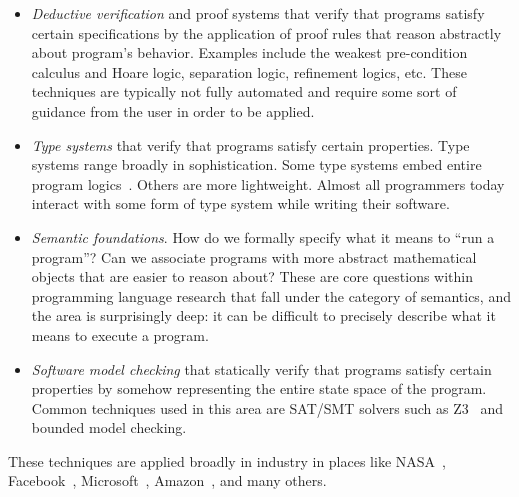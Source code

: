\documentclass{../tufte-handout}
\begin{document}
\begin{itemize}
  \item \emph{Deductive verification} and proof systems that verify that 
  programs satisfy certain specifications by the application of proof 
  rules that reason abstractly about program's behavior. Examples include the weakest
  pre-condition calculus and Hoare logic, separation logic, refinement logics, etc. 
  These techniques are typically not fully automated and require some sort of 
  guidance from the user in order to be applied.
  \item \emph{Type systems} that verify that programs satisfy certain
  properties. Type systems range broadly in sophistication. Some type systems 
  embed entire program logics~\citep{jhala2021refinement}. Others are more lightweight.
  Almost all programmers today interact with some form of type system while 
  writing their software.
  \item \emph{Semantic foundations}. How do we formally specify what it means to ``run a program''? 
  Can we associate programs with more abstract mathematical objects that are easier to 
  reason about? These are core questions within programming language research that fall under 
  the category of semantics, and the area is surprisingly deep: it can be difficult to precisely 
  describe what it means to execute a program.
  \item \emph{Software model checking} that statically verify that programs satisfy 
  certain properties by somehow representing the entire state space of the program.
  Common techniques used in this area are SAT/SMT solvers such as Z3~\citep{de2008z3}
  and bounded model checking.
\end{itemize}

These techniques are applied broadly in industry in places like NASA~\citep{calcagno2015moving}, 
Facebook~\citep{distefano2019scaling}, Microsoft~\citep{ball2004slam}, Amazon~\citep{newcombe2015amazon}, and 
many others.
\end{document}
